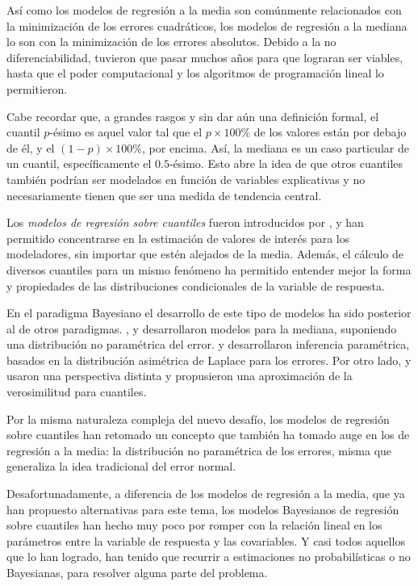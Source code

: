 As\'i como los modelos de regresi\'on a la media son com\'unmente relacionados con la minimizaci\'on de los errores cuadr\'aticos, los modelos de regresi\'on a la mediana lo son con la minimizaci\'on de los errores absolutos. Debido a la no diferenciabilidad, tuvieron que pasar muchos años para que lograran ser viables, hasta que el poder computacional y los algoritmos de programaci\'on lineal lo permitieron.

Cabe recordar que, a grandes rasgos y sin dar a\'un una definici\'on formal, el cuantil $p$-\'esimo es aquel valor tal que el $p \times 100\%$ de los valores est\'an por debajo de \'el, y el $(1-p)\times 100\%$, por encima. As\'i, la mediana es un caso particular de un cuantil, espec\'ificamente el $0.5$-\'esimo. Esto abre la idea de que otros cuantiles tambi\'en podr\'ian ser modelados en funci\'on de variables explicativas y no necesariamente tienen que ser una medida de tendencia central. 

Los \textit{modelos de regresi\'on sobre cuantiles} fueron introducidos por \cite{Koenker_QuantReg}, y han permitido concentrarse en la estimaci\'on de valores de inter\'es para los modeladores, sin importar que est\'en alejados de la media. Adem\'as, el c\'alculo de diversos cuantiles para un mismo fen\'omeno ha permitido entender mejor la forma y propiedades de las distribuciones condicionales de la variable de respuesta.

En el paradigma Bayesiano el desarrollo de este tipo de modelos ha sido posterior al de otros paradigmas. \cite{Walker_BayesAccFail}, \cite{Kottas_BaySemiparamMed} y \cite{Hanson_PolyaTrees} desarrollaron modelos para la mediana, suponiendo una distribuci\'on no param\'etrica del error. \cite{Yu_BayQuantReg} y \cite{Tsionas_BayQuantInf} desarrollaron inferencia param\'etrica, basados en la distribuci\'on asim\'etrica de Laplace para los errores. Por otro lado, \cite{Lavine_LikeQuant} y \cite{Dunson_ApproxBayes} usaron una perspectiva distinta y propusieron una aproximaci\'on de la verosimilitud para cuantiles.

Por la misma naturaleza compleja del nuevo desaf\'io, los modelos de regresi\'on sobre cuantiles han retomado un concepto que tambi\'en ha tomado auge en los de regresi\'on a la media: la distribuci\'on no param\'etrica de los errores, misma que generaliza la idea tradicional del error normal. 

Desafortunadamente, a diferencia de los modelos de regresi\'on a la media, que ya han propuesto alternativas para este tema, los modelos Bayesianos de regresi\'on sobre cuantiles han hecho muy poco por romper con la relaci\'on lineal en los par\'ametros entre la variable de respuesta y las covariables. Y casi todos aquellos que lo han logrado, han tenido que recurrir a estimaciones no probabil\'isticas o no Bayesianas, para resolver alguna parte del problema.

